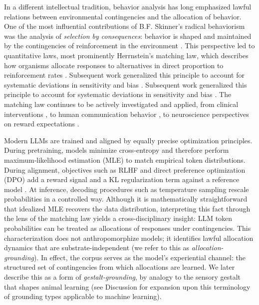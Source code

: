 \documentclass[11pt]{article}
\begin{document}
In a different intellectual tradition, behavior analysis has long
emphasized lawful relations between environmental contingencies and
the allocation of behavior. One of the most influential contributions
of B.F. Skinner's radical behaviorism was the analysis of
\emph{selection by consequences}: behavior is shaped and maintained by
the contingencies of reinforcement in the environment
\citep{skinner1953science}. This perspective led to quantitative laws,
most prominently Herrnstein's matching law, which describes how
organisms allocate responses to alternatives in direct proportion to
reinforcement rates \citep{herrnstein1961matching}. Subsequent work
generalized this principle to account for systematic deviations in
sensitivity and bias \citep{baum1974generalized}.
Subsequent work generalized this principle to account for systematic deviations
in sensitivity and bias \citep{baum1974generalized}. The matching law continues
to be actively investigated and applied, from clinical interventions
\citep{kronfli2021matching}, to human communication behavior
\citep{anderson2024texting}, to neuroscience perspectives on reward expectations
\citep{rajagopalan2023reward}.

Modern LLMs are trained and aligned by equally precise optimization
principles. During pretraining, models minimize cross‑entropy and
therefore perform maximum‑likelihood estimation (MLE) to match
empirical token distributions. During alignment, objectives such as
RLHF and direct preference optimization (DPO) add a reward signal and
a KL regularization term against a reference model
\citep{christiano2017deep,ouyang2022training,rafailov2023direct}. At
inference, decoding procedures such as temperature sampling rescale
probabilities in a controlled way.
Although it is mathematically straightforward that idealized MLE recovers the
data distribution, interpreting this fact through the lens of the matching law
yields a cross-disciplinary insight: LLM token probabilities can be treated as
allocations of responses under contingencies.
This characterization does not anthropomorphize models; it identifies lawful
allocation dynamics that are substrate-independent (we refer to this as
\emph{allocation-grounding}). In effect, the corpus serves as the model’s
experiential channel: the structured set of contingencies from which allocations
are learned. We later describe this as a form of \emph{gestalt-grounding}, by
analogy to the sensory gestalt that shapes animal learning (see Discussion for
expansion upon this terminology of grounding types applicable to machine
learning).
\end{document}
